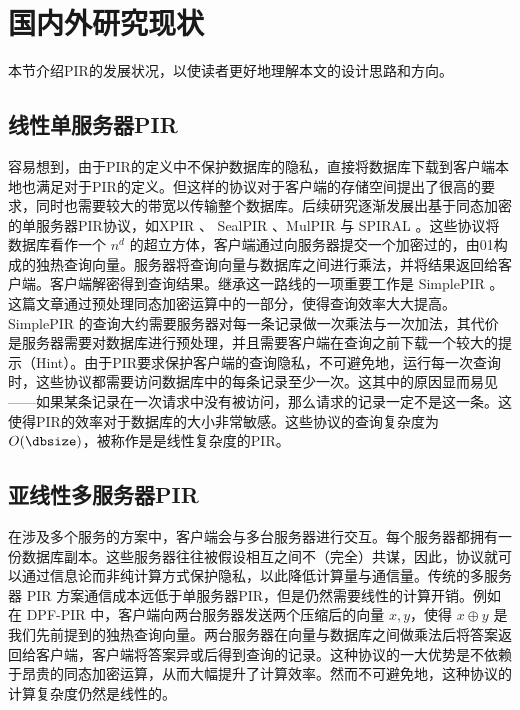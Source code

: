 \section{国内外研究现状}

本节介绍PIR的发展状况，以使读者更好地理解本文的设计思路和方向。

\subsection{线性单服务器PIR}
容易想到，由于PIR的定义中不保护数据库的隐私，直接将数据库下载到客户端本地也满足对于PIR的定义。但这样的协议对于客户端的存储空间提出了很高的要求，同时也需要较大的带宽以传输整个数据库。后续研究逐渐发展出基于同态加密的单服务器PIR协议，如XPIR \cite{EPRINT:ABFK14}、 SealPIR \cite{SP:ACLS18}、MulPIR \cite{USENIX:ALPRSSY21} 与 SPIRAL \cite{SP:MenWu22}。这些协议将数据库看作一个 $n^d$ 的超立方体，客户端通过向服务器提交一个加密过的，由01构成的独热查询向量。服务器将查询向量与数据库之间进行乘法，并将结果返回给客户端。客户端解密得到查询结果。继承这一路线的一项重要工作是 SimplePIR \cite{SimplePIR}。这篇文章通过预处理同态加密运算中的一部分，使得查询效率大大提高。SimplePIR 的查询大约需要服务器对每一条记录做一次乘法与一次加法，其代价是服务器需要对数据库进行预处理，并且需要客户端在查询之前下载一个较大的提示（Hint）。由于PIR要求保护客户端的查询隐私，不可避免地，运行每一次查询时，这些协议都需要访问数据库中的每条记录至少一次。这其中的原因显而易见——如果某条记录在一次请求中没有被访问，那么请求的记录一定不是这一条。这使得PIR的效率对于数据库的大小非常敏感。这些协议的查询复杂度为 $O(\dbsize)$，被称作是是线性复杂度的PIR。

\subsection{亚线性多服务器PIR}

在涉及多个服务的方案中，客户端会与多台服务器进行交互。每个服务器都拥有一份数据库副本。这些服务器往往被假设相互之间不（完全）共谋，因此，协议就可以通过信息论而非纯计算方式保护隐私，以此降低计算量与通信量。传统的多服务器 PIR 方案通信成本远低于单服务器PIR，但是仍然需要线性的计算开销。例如在 DPF-PIR \cite{DPF-PIR}中，客户端向两台服务器发送两个压缩后的向量 $x,y$，使得 $x\oplus y$ 是我们先前提到的独热查询向量。两台服务器在向量与数据库之间做乘法后将答案返回给客户端，客户端将答案异或后得到查询的记录。这种协议的一大优势是不依赖于昂贵的同态加密运算，从而大幅提升了计算效率。然而不可避免地，这种协议的计算复杂度仍然是线性的。

